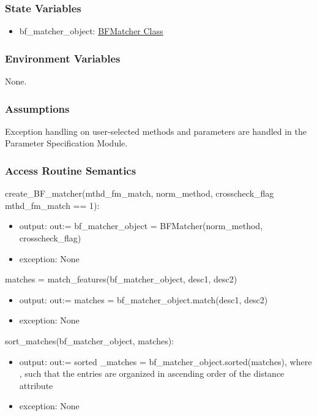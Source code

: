 \documentclass[12pt, titlepage]{article}
\begin{document}
\subsubsection{State Variables}
\begin{itemize}
  \item bf\_matcher\_object: \href{https://docs.opencv.org/3.4/d3/da1/classcv_1_1BFMatcher.html}{BFMatcher Class}
\end{itemize}
\subsubsection{Environment Variables}

None.

\subsubsection{Assumptions}

Exception handling on user-selected methods and parameters are handled in the Parameter 
Specification Module.

\subsubsection{Access Routine Semantics}
create\_BF\_matcher(mthd\_fm\_match, norm\_method, crosscheck\_flag 
\textbar \: mthd\_fm\_match == 1):
\begin{itemize}
  \item output: out:= bf\_matcher\_object = BFMatcher(norm\_method, 
  crosscheck\_flag) 
  \item exception: None
\end{itemize} 
matches = match\_features(bf\_matcher\_object, desc1, desc2) 
\begin{itemize}
  \item output: out:= matches = bf\_matcher\_object.match(desc1, desc2)
  \item exception: None
\end{itemize}
sort\_matches(bf\_matcher\_object, matches):
\begin{itemize}
  \item output: out:= sorted \_matches = bf\_matcher\_object.sorted(matches), where , such that the entries
  are organized in ascending order of the distance attribute
  \item exception: None
\end{itemize}



\end{document}
